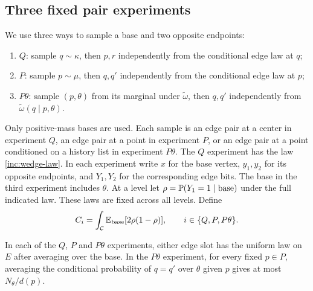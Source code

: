 \subsection{Three fixed pair experiments}

We use three ways to sample a base and two opposite endpoints:
\begin{enumerate}[label=(\roman*)]
 \item $Q$: sample $q\sim\kappa$, then $p,r$ independently from the
 conditional edge law at $q$;
 \item $P$: sample $p\sim\mu$, then $q,q'$ independently from the
 conditional edge law at $p$;
 \item $P\theta$: sample $(p,\theta)$ from its marginal under
 $\widetilde\omega$, then $q,q'$ independently from $\widetilde\omega(q\mid p,\theta)$.
\end{enumerate}
Only positive-mass bases are used.  Each sample is an edge pair at a center in experiment $Q$, an edge pair at a point in experiment $P$, or an edge pair at a point conditioned on a history list in experiment $P\theta$. The $Q$ experiment has
the law \eqref{inc:wedge-law}.  In each experiment write $x$ for
the base vertex, $y_1,y_2$ for its opposite
endpoints, and $Y_1,Y_2$ for the corresponding edge bits.  The base in the third experiment
includes $\theta$.  At a level let
$\rho=\mathbb P(Y_1=1\mid\text{base})$ under the full indicated law.
These laws are fixed across all levels.  Define
\begin{equation}\label{bud:variations}
 C_i=\int_{\mathcal C}\mathbb E_{\mathrm{base}}[2\rho(1-\rho)],
 \qquad i\in\{Q,P,P\theta\}.
\end{equation}

\begin{lemma}\label{bud:pair-laws}
In each of the $Q$, $P$ and $P\theta$ experiments, either edge slot
has the uniform law on $E$ after averaging over the base. In the
$P\theta$ experiment, for every fixed $p\in P$, averaging the
conditional probability of $q=q'$ over $\theta$ given $p$ gives at
most $N_\theta/d(p)$.
\end{lemma}

